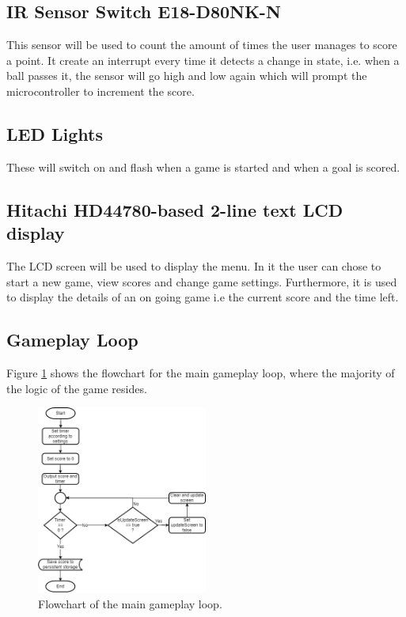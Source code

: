 \documentclass[11pt,a4paper,twocolumn]{article}
\begin{document}
\subsection{IR Sensor Switch E18-D80NK-N}
This sensor will be used to count the amount of times the user manages to score a point. It create an interrupt every time it detects a change in state, i.e. when a ball passes it, the sensor will go high and low again which will prompt the microcontroller to increment the score.

\subsection{LED Lights}
These will switch on and flash when a game is started and when a goal is scored.

\subsection{Hitachi HD44780-based 2-line text LCD display}
The LCD screen will be used to display the menu. In it the user can chose to start a new game, view scores and change game settings. Furthermore, it is used to display the details of an on going game i.e the current score and the time left.

\subsection{Gameplay Loop}
Figure \ref{flow} shows the flowchart for the main gameplay loop, where the majority of the logic of the game resides.

\begin{figure}[!ht]
	\includegraphics[width=0.5\textwidth]{InGameLoopFC.png}
\caption{Flowchart of the main gameplay loop.}
\label{flow}
\end{figure}
\end{document}
